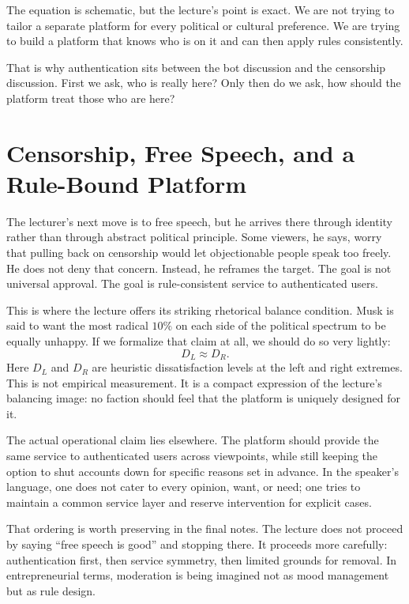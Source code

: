 The equation is schematic, but the lecture's point is exact. We are not trying to tailor a separate platform for every political or cultural preference. We are trying to build a platform that knows who is on it and can then apply rules consistently.

That is why authentication sits between the bot discussion and the censorship discussion. First we ask, who is really here? Only then do we ask, how should the platform treat those who are here?

\section{Censorship, Free Speech, and a Rule-Bound Platform}

The lecturer's next move is to free speech, but he arrives there through identity rather than through abstract political principle. Some viewers, he says, worry that pulling back on censorship would let objectionable people speak too freely. He does not deny that concern. Instead, he reframes the target. The goal is not universal approval. The goal is rule-consistent service to authenticated users.

This is where the lecture offers its striking rhetorical balance condition. Musk is said to want the most radical \(10\%\) on each side of the political spectrum to be equally unhappy. If we formalize that claim at all, we should do so very lightly:
\begin{equation}
D_L \approx D_R.
\end{equation}
Here \(D_L\) and \(D_R\) are heuristic dissatisfaction levels at the left and right extremes. This is not empirical measurement. It is a compact expression of the lecture's balancing image: no faction should feel that the platform is uniquely designed for it.

The actual operational claim lies elsewhere. The platform should provide the same service to authenticated users across viewpoints, while still keeping the option to shut accounts down for specific reasons set in advance. In the speaker's language, one does not cater to every opinion, want, or need; one tries to maintain a common service layer and reserve intervention for explicit cases.

That ordering is worth preserving in the final notes. The lecture does not proceed by saying ``free speech is good'' and stopping there. It proceeds more carefully: authentication first, then service symmetry, then limited grounds for removal. In entrepreneurial terms, moderation is being imagined not as mood management but as rule design.

